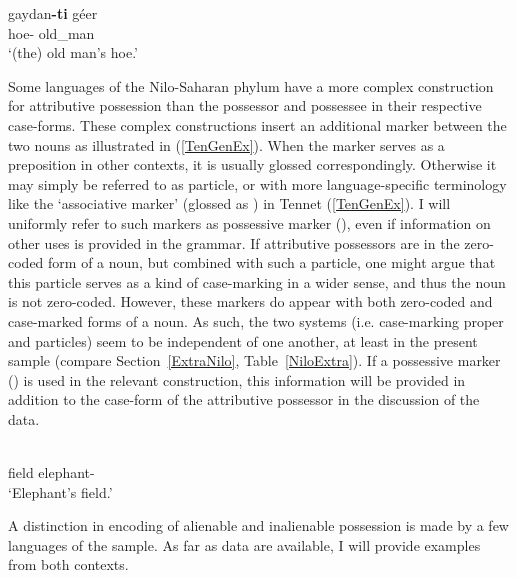 
\begin{exe}\ex\label{ArbAntiGen}
\gll gaydan\textbf{-ti} g\'eer\\
 hoe-\antgen{} old\_man\\
 \glt `(the) old man's hoe.'
 \end{exe} 
 
Some languages of the Nilo-Saharan phylum have a more complex construction for attributive possession than the possessor and possessee in their respective case-forms.
These complex constructions insert an additional marker between the two nouns as illustrated in (\ref{TenGenEx}). 
When the marker serves as a preposition in other contexts, it is usually glossed correspondingly. 
Otherwise it may simply be referred to as particle, or with more language-specific terminology like the `associative marker' (glossed as \am{}) in Tennet (\ref{TenGenEx}).
I will uniformly refer to such markers as possessive marker (\poss{}), even if information on other uses is provided in the grammar.
If attributive possessors are in the zero-coded form of a noun, but combined with such a particle, one might argue that this particle serves as a kind of case-marking in a wider sense, and thus the noun is not zero-coded.
However, these markers do appear with both zero-coded and case-marked forms of a noun.
As such, the two systems (i.e. case-marking proper and particles) seem to be independent of one another, at least in the present sample (compare Section~\ref{ExtraNilo}, Table~\ref{NiloExtra}). 
If a possessive marker (\poss{}) is used in the relevant construction, this information will be provided in addition to the case-form of the attributive possessor in the discussion of the data.

\pagebreak

\begin{exe} 
\ex\label{TenGenEx}
\gll{}   \\
field \am{} elephant-\gen{}\\
\glt `Elephant's field.'  
\end{exe}
 
A distinction in encoding of alienable and inalienable possession is made by a few languages of the sample. 
As far as data are available, I will provide examples from both contexts.


